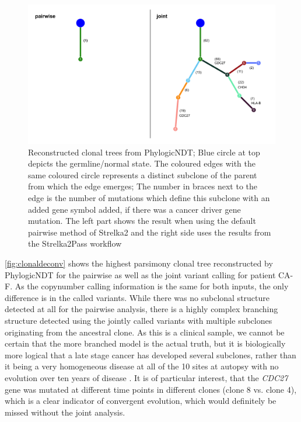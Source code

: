 \begin{figure}[ht]
\centering
\includegraphics[width=.99\linewidth]{Figures/jointVariantCalling/clonalDeconv.pdf}
\caption[Reconstructed clonal trees for joint and pairwise variant calling]{Reconstructed clonal trees from PhylogicNDT; Blue circle at top depicts the germline/normal state. The coloured edges with the same coloured circle represents a distinct subclone of the parent from which the edge emerges; The number in braces next to the edge is the number of mutations which define this subclone with an added gene symbol added, if there was a cancer driver gene mutation. The left part shows the result when using the default pairwise method of Strelka2 and the right side uses the results from the Strelka2Pass workflow}\label{fig:clonaldeconv}
\end{figure}


\autoref{fig:clonaldeconv} shows the highest parsimony clonal tree reconstructed by PhylogicNDT for the pairwise as well as the joint variant calling for patient CA-F. As the copynumber calling information is the same for both inputs, the only difference is in the called variants. While there was no subclonal structure detected at all for the pairwise analysis, there is a highly complex branching structure detected using the jointly called variants with multiple subclones originating from the ancestral clone. As this is a clinical sample, we cannot be certain that the more branched model is the actual truth, but it is biologically more logical that a late stage cancer has developed several subclones, rather than it being a very homogeneous disease at all of the 10 sites at autopsy with no evolution over ten years of disease \cite{Gerstung2020}.
It is of particular interest, that the \textit{CDC27} gene was mutated at different time points in different clones (clone 8 vs. clone 4), which is a clear indicator of convergent evolution, which would definitely be missed without the joint analysis.


